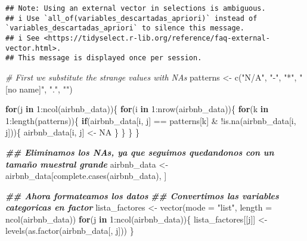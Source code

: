 \documentclass[
]{article}
\newenvironment{Shaded}{\begin{snugshade}}{\end{snugshade}}
\newcommand{\AttributeTok}[1]{\textcolor[rgb]{0.77,0.63,0.00}{#1}}
\newcommand{\CommentTok}[1]{\textcolor[rgb]{0.56,0.35,0.01}{\textit{#1}}}
\newcommand{\ConstantTok}[1]{\textcolor[rgb]{0.00,0.00,0.00}{#1}}
\newcommand{\ControlFlowTok}[1]{\textcolor[rgb]{0.13,0.29,0.53}{\textbf{#1}}}
\newcommand{\DecValTok}[1]{\textcolor[rgb]{0.00,0.00,0.81}{#1}}
\newcommand{\DocumentationTok}[1]{\textcolor[rgb]{0.56,0.35,0.01}{\textbf{\textit{#1}}}}
\newcommand{\FunctionTok}[1]{\textcolor[rgb]{0.00,0.00,0.00}{#1}}
\newcommand{\NormalTok}[1]{#1}
\newcommand{\OtherTok}[1]{\textcolor[rgb]{0.56,0.35,0.01}{#1}}
\newcommand{\SpecialCharTok}[1]{\textcolor[rgb]{0.00,0.00,0.00}{#1}}
\newcommand{\StringTok}[1]{\textcolor[rgb]{0.31,0.60,0.02}{#1}}
\begin{document}
\begin{verbatim}
## Note: Using an external vector in selections is ambiguous.
## i Use `all_of(variables_descartadas_apriori)` instead of `variables_descartadas_apriori` to silence this message.
## i See <https://tidyselect.r-lib.org/reference/faq-external-vector.html>.
## This message is displayed once per session.
\end{verbatim}

\begin{Shaded}
\begin{Highlighting}[]
\CommentTok{\# First we substitute the strange values with NA\textquotesingle{}s}
\NormalTok{patterns }\OtherTok{\textless{}{-}} \FunctionTok{c}\NormalTok{(}\StringTok{"N/A"}\NormalTok{, }\StringTok{"{-}"}\NormalTok{, }\StringTok{"*"}\NormalTok{, }\StringTok{"[no name]"}\NormalTok{, }\StringTok{"."}\NormalTok{, }\StringTok{""}\NormalTok{)}

\ControlFlowTok{for}\NormalTok{(j }\ControlFlowTok{in} \DecValTok{1}\SpecialCharTok{:}\FunctionTok{ncol}\NormalTok{(airbnb\_data))\{}
        \ControlFlowTok{for}\NormalTok{(i }\ControlFlowTok{in} \DecValTok{1}\SpecialCharTok{:}\FunctionTok{nrow}\NormalTok{(airbnb\_data))\{}
                \ControlFlowTok{for}\NormalTok{(k }\ControlFlowTok{in} \DecValTok{1}\SpecialCharTok{:}\FunctionTok{length}\NormalTok{(patterns))\{}
                        \ControlFlowTok{if}\NormalTok{(airbnb\_data[i, j] }\SpecialCharTok{==}\NormalTok{ patterns[k] }\SpecialCharTok{\&} \SpecialCharTok{!}\FunctionTok{is.na}\NormalTok{(airbnb\_data[i, j]))\{}
\NormalTok{                                airbnb\_data[i, j] }\OtherTok{\textless{}{-}} \ConstantTok{NA}
\NormalTok{                        \}}
\NormalTok{                \}}
\NormalTok{        \}}
\NormalTok{\}}

\DocumentationTok{\#\# Eliminamos los NA\textquotesingle{}s, ya que seguimos quedandonos con un tamaño muestral grande}
\NormalTok{airbnb\_data }\OtherTok{\textless{}{-}}\NormalTok{ airbnb\_data[}\FunctionTok{complete.cases}\NormalTok{(airbnb\_data), ]}


\DocumentationTok{\#\# Ahora formateamos los datos}
\DocumentationTok{\#\# Convertimos las variables categoricas en factor}
\NormalTok{lista\_factores }\OtherTok{\textless{}{-}} \FunctionTok{vector}\NormalTok{(}\AttributeTok{mode =} \StringTok{"list"}\NormalTok{, }\AttributeTok{length =} \FunctionTok{ncol}\NormalTok{(airbnb\_data))}
\ControlFlowTok{for}\NormalTok{(j }\ControlFlowTok{in} \DecValTok{1}\SpecialCharTok{:}\FunctionTok{ncol}\NormalTok{(airbnb\_data))\{}
\NormalTok{        lista\_factores[[j]] }\OtherTok{\textless{}{-}} \FunctionTok{levels}\NormalTok{(}\FunctionTok{as.factor}\NormalTok{(airbnb\_data[, j]))}
\NormalTok{\}}


\end{Highlighting}
\end{Shaded}
\end{document}

